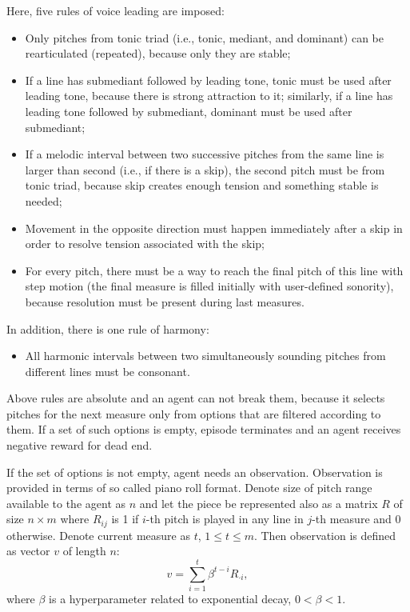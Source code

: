 \documentclass{article}
\begin{document}
Here, five rules of voice leading are imposed:
\begin{itemize}
	\item Only pitches from tonic triad (i.e., tonic, mediant, and dominant) can be rearticulated (repeated), because only they are stable;
	\item If a line has submediant followed by leading tone, tonic must be used after leading tone, because there is strong attraction to it; similarly, if a line has leading tone followed by submediant, dominant must be used after submediant;
	\item If a melodic interval between two successive pitches from the same line is larger than second (i.e., if there is a skip), the second pitch must be from tonic triad, because skip creates enough tension and something stable is needed;
	\item Movement in the opposite direction must happen immediately after a skip in order to resolve tension associated with the skip;
	\item For every pitch, there must be a way to reach the final pitch of this line with step motion (the final measure is filled initially with user-defined sonority), because resolution must be present during last measures.
\end{itemize}
In addition, there is one rule of harmony:
\begin{itemize}
	\item All harmonic intervals between two simultaneously sounding pitches from different lines must be consonant.
\end{itemize}

Above rules are absolute and an agent can not break them, because it selects pitches for the next measure only from options that are filtered according to them. If a set of such options is empty, episode terminates and an agent receives negative reward for dead end.

If the set of options is not empty, agent needs an observation. Observation is provided in terms of so called piano roll format. Denote size of pitch range available to the agent as $n$ and let the piece be represented also as a matrix $R$ of size $n \times m$ where $R_{ij}$ is 1 if $i$-th pitch is played in any line in $j$-th measure and 0 otherwise. Denote current measure as $t$, $1 \le t \le m$. Then observation is defined as vector $v$ of length $n$:
$$v = \sum_{i = 1}^t \beta^{t - i} R_{\cdot i},$$
where $\beta$ is a hyperparameter related to exponential decay, $0 < \beta < 1$.
\end{document}
